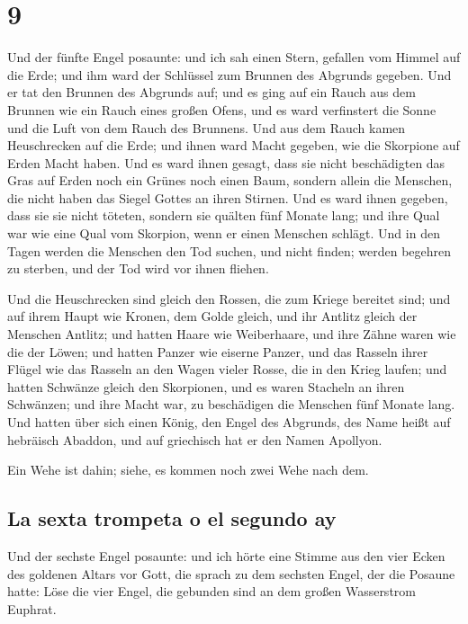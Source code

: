 \hypertarget{section-8}{%
\section{9}\label{section-8}}

 Und der fünfte Engel posaunte: und ich sah einen Stern,
gefallen vom Himmel auf die Erde; und ihm ward der Schlüssel zum Brunnen
des Abgrunds gegeben.  Und er tat den Brunnen des Abgrunds
auf; und es ging auf ein Rauch aus dem Brunnen wie ein Rauch eines
großen Ofens, und es ward verfinstert die Sonne und die Luft von dem
Rauch des Brunnens.  Und aus dem Rauch kamen Heuschrecken
auf die Erde; und ihnen ward Macht gegeben, wie die Skorpione auf Erden
Macht haben.  Und es ward ihnen gesagt, dass sie nicht
beschädigten das Gras auf Erden noch ein Grünes noch einen Baum, sondern
allein die Menschen, die nicht haben das Siegel Gottes an ihren Stirnen.
 Und es ward ihnen gegeben, dass sie sie nicht töteten,
sondern sie quälten fünf Monate lang; und ihre Qual war wie eine Qual
vom Skorpion, wenn er einen Menschen schlägt.  Und in den
Tagen werden die Menschen den Tod suchen, und nicht finden; werden
begehren zu sterben, und der Tod wird vor ihnen fliehen.

 Und die Heuschrecken sind gleich den Rossen, die zum
Kriege bereitet sind; und auf ihrem Haupt wie Kronen, dem Golde gleich,
und ihr Antlitz gleich der Menschen Antlitz;  und hatten
Haare wie Weiberhaare, und ihre Zähne waren wie die der Löwen;
 und hatten Panzer wie eiserne Panzer, und das Rasseln
ihrer Flügel wie das Rasseln an den Wagen vieler Rosse, die in den Krieg
laufen;  und hatten Schwänze gleich den Skorpionen, und
es waren Stacheln an ihren Schwänzen; und ihre Macht war, zu beschädigen
die Menschen fünf Monate lang.  Und hatten über sich
einen König, den Engel des Abgrunds, des Name heißt auf hebräisch
Abaddon, und auf griechisch hat er den Namen Apollyon.

 Ein Wehe ist dahin; siehe, es kommen noch zwei Wehe nach
dem.

\hypertarget{la-sexta-trompeta-o-el-segundo-ay}{%
\subsection{La sexta trompeta o el segundo
ay}\label{la-sexta-trompeta-o-el-segundo-ay}}

 Und der sechste Engel posaunte: und ich hörte eine
Stimme aus den vier Ecken des goldenen Altars vor Gott, 
die sprach zu dem sechsten Engel, der die Posaune hatte: Löse die vier
Engel, die gebunden sind an dem großen Wasserstrom Euphrat.

